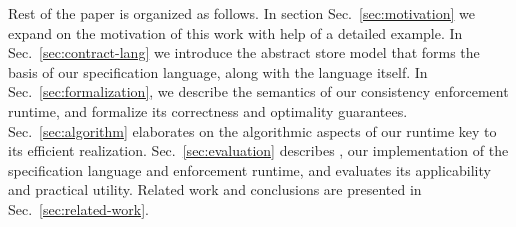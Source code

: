 Rest of the paper is organized as follows.  In section
Sec.~\ref{sec:motivation} we expand on the motivation of this work
with help of a detailed example. In Sec.~\ref{sec:contract-lang} we
introduce the abstract store model that forms the basis of our
specification language, along with the language itself. In
Sec.~\ref{sec:formalization}, we describe the semantics of our
consistency enforcement runtime, and formalize its correctness and
optimality guarantees. Sec.~\ref{sec:algorithm} elaborates on the
algorithmic aspects of our runtime key to its efficient realization.
Sec.~\ref{sec:evaluation} describes \tool, our implementation of the
specification language and enforcement runtime, and evaluates its
applicability and practical utility.  Related work and conclusions are
presented in Sec.~\ref{sec:related-work}.
